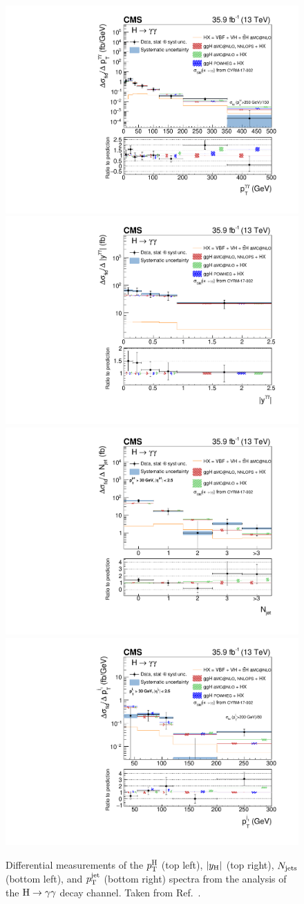 \begin{figure}[hbtp]
  \begin{center}
    \includegraphics[width=0.49\linewidth]{img/inputs/hgg/pth.pdf}
    \includegraphics[width=0.49\linewidth]{img/inputs/hgg/absy.pdf}
    \\
    \includegraphics[width=0.49\linewidth]{img/inputs/hgg/njets.pdf}
    \includegraphics[width=0.49\linewidth]{img/inputs/hgg/ptjet.pdf}
    \caption{
        Differential measurements of the $p_\mathrm{T}^\mathrm{H}$ (top left), $\left|y_\mathrm{H}\right| $ (top right), $N_\text{jets} $ (bottom left), and $p_\mathrm{T}^\text{jet} $ (bottom right) spectra from the analysis of the $\mathrm{H}\to\mathrm{\gamma}\mathrm{\gamma}$ decay channel.
        Taken from Ref.~\cite{Sirunyan:2018kta}.
        }
    \label{fig:hgg-results}
  \end{center}
\end{figure}



